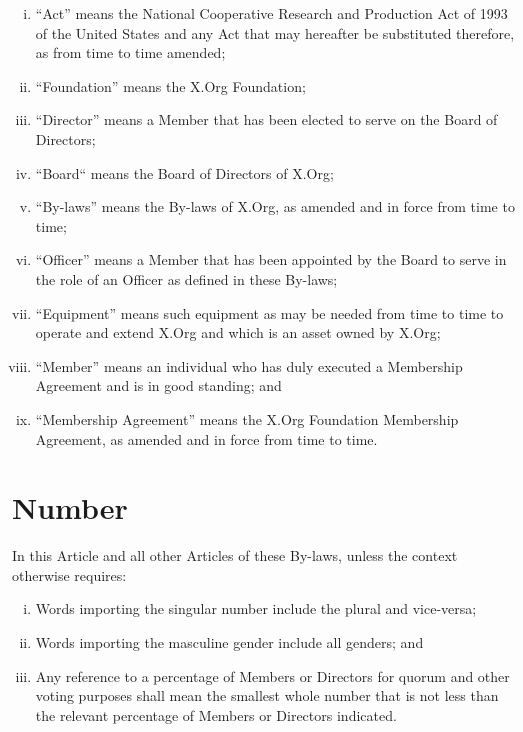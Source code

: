 \documentclass[10pt, english]{bylaws}
\begin{document}
\begin{enumerate}[(i)\hspace{.2cm}]
	\item ``Act'' means the National Cooperative Research and Production Act
	of 1993 of the United States and any Act that may hereafter be
	substituted therefore, as from time to time amended;

	\item ``Foundation'' means the X.Org Foundation;

	\item ``Director'' means a Member that has been elected to serve on the
	Board of Directors;

	\item ``Board`` means the Board of Directors of X.Org;

	\item ``By-laws'' means the By-laws of X.Org, as amended and in force
	from time to time;

	\item ``Officer'' means a Member that has been appointed by the Board to
	serve in the role of an Officer as defined in these By-laws;

	\item ``Equipment'' means such equipment as may be needed from time to
	time to operate and extend X.Org and which is an asset owned by X.Org;

	\item ``Member'' means an individual who has duly executed a Membership
	Agreement and is in good standing; and

	\item ``Membership Agreement'' means the X.Org Foundation Membership
	Agreement, as amended and in force from time to time.
\end{enumerate}

\section{Number}
In this Article and all other Articles of these By-laws, unless the context
otherwise requires:

\begin{enumerate}[(i)\hspace{.2cm}]
	\item Words importing the singular number include the plural and
		vice-versa;

	\item Words importing the masculine gender include all genders; and

	\item Any reference to a percentage of Members or Directors for quorum
	and other voting purposes shall mean the smallest whole number
	that is not less than the relevant percentage of Members or Directors
	indicated.
\end{enumerate}
\end{document}
